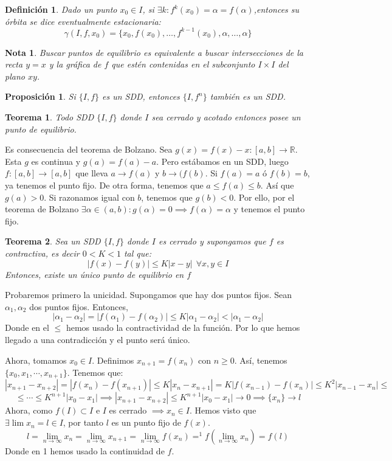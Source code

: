 \documentclass[11pt, a4paper]{article}
\makeatletter
\newif\IfInSansMode
\let\oldsf\sffamily
\renewcommand*{\sffamily}{\oldsf\mathversion{sans}\InSansModetrue}
\let\oldnorm\normalfont
\renewcommand*{\normalfont}{\oldnorm\InSansModefalse\mathversion{normal}}
\renewenvironment{proof}[1][\proofname] {\vspace{-15pt}\par\pushQED{\qed}\normalfont\topsep6\p@\@plus6\p@\relax\trivlist\item[\hskip\labelsep\it#1\@addpunct{.}]\ignorespaces}{\popQED\endtrivlist\@endpefalse}
\numberwithin{equation}{section}
\newcommand{\R}{\mathbb{R}}
\renewenvironment{proof}[1][\proofname] {\par\pushQED{\qed}\normalfont\topsep6\p@\@plus6\p@\relax\trivlist\item[\hskip\labelsep\itshape\sffamily#1\@addpunct{.}]\ignorespaces}{\popQED\endtrivlist\@endpefalse}
\theoremstyle{theorem-style}
\newtheorem{nth}{Teorema}[section]
\newtheorem{nprop}{Proposición}[section]
\theoremstyle{definition-style}
\newtheorem{ndef}{Definición}[section]
\theoremstyle{remark-style}
\newtheorem*{nota}{Nota}
\theoremstyle{example-style}
\makeatother
\begin{document}
\begin{ndef}
	Dado un punto $x_0 \in I$, si $\exists k: f^k(x_0) = \alpha = f(\alpha)$,entonces su órbita se dice eventualmente estacionaria:
	\[
	\gamma(I,f,x_0) = \{x_0, f(x_0), \dots, f^{k-1}(x_0), \alpha, \dots, \alpha\}
	\]
\end{ndef}
\begin{nota}
	Buscar puntos de equilibrio es equivalente a buscar intersecciones de la recta $y=x$ y la gráfica de $f$ que estén contenidas en el subconjunto $I\times I$ del plano $xy$.
\end{nota}

\begin{nprop}
	Si $\{I,f\}$ es un SDD, entonces $\{I,f^n\}$ también es un SDD.
\end{nprop}

\begin{nth}
	Todo SDD $\{I,f\}$ donde $I$ sea cerrado y acotado entonces posee un punto de equilibrio.
\end{nth}
\begin{proof}
	Es consecuencia del teorema de Bolzano. Sea $g(x) = f(x)-x :[a,b] \to \R$. Esta $g$ es continua y $g(a) = f(a)-a$. Pero estábamos en un SDD, luego $f:[a,b] \to [a,b]$ que lleva $a \to f(a) $ y $b \to(f(b)$. Si $f(a) = a $ ó $f(b) = b$, ya tenemos el punto fijo. De otra forma, tenemos que  $a \leq f(a) \leq b$.
	Así que $g(a) > 0$. Si razonamos igual con $b$, tenemos que $g(b) < 0$. 
	Por ello, por el teorema de Bolzano $\exists \alpha \in (a,b) : g(\alpha) = 0 \implies f(\alpha) = \alpha $ y tenemos el punto fijo.
	

\end{proof}
\begin{nth}
	Sea un SDD $\{I,f\}$ donde $I$ es cerrado y supongamos que $f$ es contractiva, es decir $0 < K < 1$ tal que:
	\[
	|f(x)-f(y)| \leq K |x-y| \ \ \forall x,y \in I
	\]
Entonces, existe un único punto de equilibrio en $f$
\end{nth}

\begin{proof}
	Probaremos primero la unicidad. Supongamos que hay dos puntos fijos. Sean $\alpha_1, \alpha_2$ dos puntos fijos. Entonces,
	 \[
	|\alpha_1 - \alpha_2| = |f(\alpha_1)- f(\alpha_2)| \leq K |\alpha_1 - \alpha_2| < |\alpha_1 - \alpha_2|
	\]
	Donde en el $\leq$ hemos usado la contractividad de la función. Por lo que hemos llegado a una contradicción y el punto será único.
	
	Ahora, tomamos $x_0\in I$. Definimos $x _{n+1} = f(x_n) $ con $n\geq 0$. Así, tenemos $\{x_0,x_1,\cdots , x _{n+1}\}$. Tenemos que:
	\[
	|x _{n+1} - x _{n+2}| = |f(x_n) - f(x _{n+1})| \leq K |x_n - x _{n+1}|= K |f(x _{n-1})- f(x_n)| \leq K^2|x _{n-1}-x_n| \leq 
	\]
	\[
	\leq \cdots \leq K^{n+1}|x_0 - x_1| \implies |x _{n+1}- x _{n+2}| \leq K^{n+1}|x_0-x_1| \to 0 \implies \{x_n\} \to l 
	\]
	Ahora, como $f(I)\subset I$ e $I$ es cerrado $\implies x_n \in I $. 
	Hemos visto que $\exists \lim x_n = l \in I$, por tanto $l$ es un punto fijo de $f(x)$.
	\[
	l =  \lim_{n\to \infty}x_n = \lim_{n\to \infty}x_{n+1} = \lim_{n\to \infty}f(x_n) =^1 f(\lim_{n\to \infty}x_n) = f(l)  
	\]
	Donde en 1 hemos usado la continuidad de $f$.
\end{proof}
\end{document}

